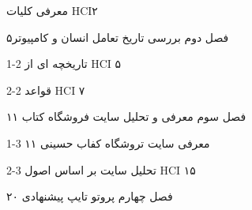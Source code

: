 \documentclass[13pt]{article}
\begin{document}
{\raggedleft
{\large معرفی کلیات
HCI\hspace{15pt}\hspace{15pt}\hspace{15pt}\hspace{15pt}\hspace{15pt}\hspace{15pt}\hspace{15pt}\hspace{15pt}۲}
}

{\raggedleft
{\large فصل دوم \hspace{15pt}بررسی تاریخ تعامل انسان و
کامپیوتر\hspace{15pt}\hspace{15pt}۵}
}

{\raggedleft
{\large 1-2 تاریخچه ای از HCI
\hspace{15pt}\hspace{15pt}\hspace{15pt}\hspace{15pt}\hspace{15pt}\hspace{15pt}۵}
}

{\raggedleft
{\large 2-2 قواعد HCI
\hspace{15pt}\hspace{15pt}\hspace{15pt}\hspace{15pt}\hspace{15pt}\hspace{15pt}\hspace{15pt}\hspace{15pt}۷}
}

{\raggedleft
{\large فصل سوم \hspace{15pt}معرفی و تحلیل سایت فروشگاه کتاب
\hspace{15pt}\hspace{15pt}۱۱}
}

{\raggedleft
{\large 1-3 معرفی سایت تروشگاه کفاب حسینی
\hspace{15pt}\hspace{15pt}\hspace{15pt}\hspace{15pt}۱۱}
}

{\raggedleft
{\large 2-3 تحلیل سایت بر اساس اصول HCI
\hspace{15pt}\hspace{15pt}\hspace{15pt}\hspace{15pt}۱۵}
}

{\raggedleft
{\large فصل چهارم پروتو تایپ پیشنهادی
\hspace{15pt}\hspace{15pt}\hspace{15pt}\hspace{15pt}۲۰}
}
\end{document}
